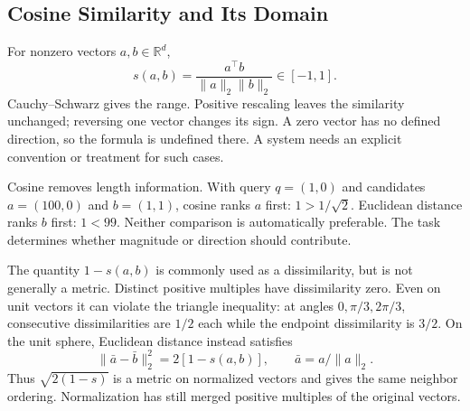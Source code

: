 \par\addvspace{\intextsep}\noindent\begin{minipage}{\linewidth}
\centering
{}
\label{fig:tiny-embedding-scatter}
\end{minipage}\par\addvspace{\intextsep}

\subsection{Cosine Similarity and Its Domain}

For nonzero vectors $a,b\in\mathbb R^d$,
\[
s(a,b)=\frac{a^\top b}{\|a\|_2\|b\|_2}\in[-1,1].
\]
Cauchy--Schwarz gives the range. Positive rescaling leaves the similarity unchanged; reversing one vector changes its sign. A zero vector has no defined direction, so the formula is undefined there. A system needs an explicit convention or treatment for such cases.

Cosine removes length information. With query $q=(1,0)$ and candidates $a=(100,0)$ and $b=(1,1)$, cosine ranks $a$ first: $1>1/\sqrt2$. Euclidean distance ranks $b$ first: $1<99$. Neither comparison is automatically preferable. The task determines whether magnitude or direction should contribute.

The quantity $1-s(a,b)$ is commonly used as a dissimilarity, but is not generally a metric. Distinct positive multiples have dissimilarity zero. Even on unit vectors it can violate the triangle inequality: at angles $0,\pi/3,2\pi/3$, consecutive dissimilarities are $1/2$ each while the endpoint dissimilarity is $3/2$. On the unit sphere, Euclidean distance instead satisfies
\[
\|\bar a-\bar b\|_2^2=2[1-s(a,b)],
\qquad\bar a=a/\|a\|_2.
\]
Thus $\sqrt{2(1-s)}$ is a metric on normalized vectors and gives the same neighbor ordering. Normalization has still merged positive multiples of the original vectors.

